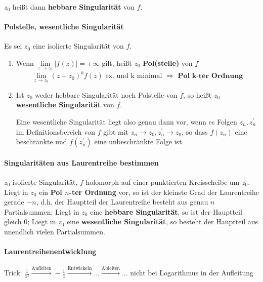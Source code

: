 \documentclass[a4paper, 10pt, DIV20, headings=small]{scrartcl}
\theoremstyle{definition}
\theoremstyle{plain}
\begin{document}
$z_0$ heißt dann \textbf{hebbare Singularität} von $f$.

\paragraph{Polstelle, wesentliche Singularität}
Es sei $z_0$ eine isolierte Singularität von $f$.
\begin{enumerate}
\item Wenn $\lim\limits_{z \rightarrow z_0} |f(z)| = + \infty$ gilt, heißt $z_0$ \textbf{Pol(stelle)} von $f$
$$\lim\limits_{z \to z_0} (z-z_0)^k f(z) \text{ ex. und k minimal } \Rightarrow \textbf{ Pol k-ter Ordnung}$$
\item Ist $z_0$ weder hebbare Singularität noch Polstelle von $f$, so heißt $z_0$ \textbf{wesentliche Singularität} von $f$.

Eine wesentliche Singularität liegt also genau dann vor, wenn es Folgen $z_n, z_n^\prime$ im
Definitionsbereich von $f$ gibt mit $z_n \rightarrow z_0, z_n^\prime \rightarrow z_0$, so dass $f(z_n)$ eine beschränkte und $f(z_n^\prime)$ eine unbeschränkte Folge ist.

\end{enumerate}

\paragraph{Singularitäten aus Laurentreihe bestimmen}
$z_0$ isolierte Singularität, $f$ holomorph auf einer punktierten Kreisscheibe um $z_0$.
	Liegt in $z_0$ ein \textbf{Pol $n$-ter Ordnung} vor, so ist der kleinste Grad der Laurentreihe gerade $-n$, d.h. der Hauptteil der Laurentreihe besteht aus genau $n$ Partialsummen; 
	Liegt in $z_0$ eine \textbf{hebbare Singularität}, so ist der Hauptteil gleich $0$; 
	Liegt in $z_0$ eine \textbf{wesentliche Singularität}, so besteht der Hauptteil aus unendlich vielen Partialsummen.

\paragraph{Laurentreihenentwicklung}
Trick: $\frac{1}{z^2} \overset{\text{Aufleiten}}{\rightarrow} -\frac{1}{z} \overset{\text{Entwickeln}}{\rightarrow} \ldots \overset{\text{Ableiten}}{\rightarrow} \ldots$ nicht bei Logarithmus in der Aufleitung
\end{document}

